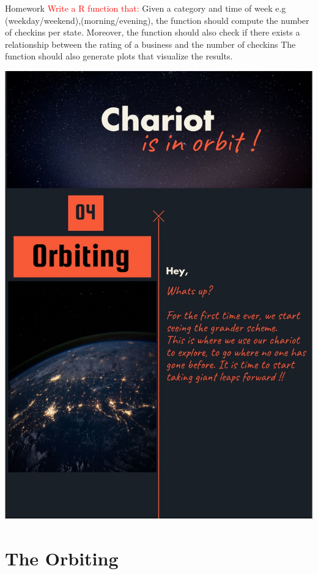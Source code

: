 \documentclass[12pt]{book}\usepackage{knitr}
\begin{document}
\begin{DIY}{Homework}
\noindent \textcolor{red}{Write a R function that:} Given a category and time of week e.g (weekday/weekend),(morning/evening), the function should compute the number of checkins per state. Moreover, the function should also check if there exists a relationship between the rating of a business and the number of checkins 
The function should also generate plots that visualize the results.
\end{DIY}



\newpage


\cleardoublepage
\thispagestyle{empty}
\includegraphics[width = 16 cm]{./viz/ext/Orbit.jpeg}
 \chapter{The Orbiting}
\end{document}
